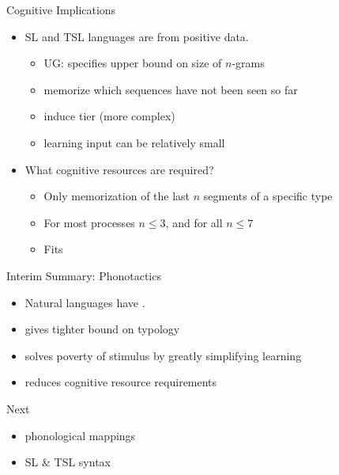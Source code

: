 \documentclass[xcolor={usenames,svgnames,x11names,table}]{beamer}
\begin{document}
\begin{frame}{Cognitive Implications}
    \begin{itemize}
        \item SL and TSL languages are  from positive data.\\
            \begin{itemize}
                \item UG: specifies upper bound on size of $n$-grams
                \item memorize which sequences have not been seen so far
                \item induce tier (more complex)
                \item learning input can be relatively small
            \end{itemize}
        \item What cognitive resources are required?\\
            \begin{itemize}
                \item Only memorization of the last $n$ segments of a specific type
                \item For most processes $n \leq 3$, and for all $n \leq 7$
                \item Fits 
            \end{itemize}

    \end{itemize}
\end{frame}

\begin{frame}{Interim Summary: Phonotactics}
    \begin{itemize}
        \item Natural languages have . 
        \item gives tighter bound on typology
        \item solves poverty of stimulus by greatly simplifying learning
        \item reduces cognitive resource requirements
    \end{itemize}

    \pause
    \begin{block}{Next}
        \begin{itemize}
            \item phonological mappings
            \item SL \& TSL syntax
        \end{itemize}
    \end{block}
\end{frame}
\end{document}
